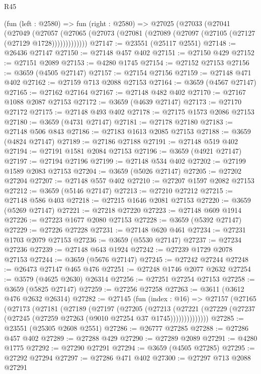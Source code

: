 \begin{lexlean}{R45}
\begin{coremodule}
    (fun (left : @2580) =>
    fun (right : @2580) =>
    @27025
      (@27033
        (@27041
          (@27049
            (@27057
              (@27065 (@27073 (@27081 (@27089 (@27097 (@27105 (@27127 (@27129 @1728)))))))))))))
@27147 := @23551 (@25117 @2551)
@27148 := @26436 @27147
@27150 := @27148 @457 @402
@27151 := @27150 @429
@27152 := @27151 @2089
@27153 := @4280 @1745
@27154 := @27152 @27153
@27156 := @3659 (@4505 @27147)
@27157 := @27154 @27156
@27159 := @27148 @471 @402
@27162 := @27159 @713 @2088 @27153
@27164 := @3659 (@4567 @27147)
@27165 := @27162 @27164
@27167 := @27148 @482 @402
@27170 := @27167 @1088 @2087 @27153
@27172 := @3659 (@4639 @27147)
@27173 := @27170 @27172
@27175 := @27148 @493 @402
@27178 := @27175 @1573 @2086 @27153
@27180 := @3659 (@4731 @27147)
@27181 := @27178 @27180
@27183 := @27148 @506 @843
@27186 := @27183 @1613 @2085 @27153
@27188 := @3659 (@4824 @27147)
@27189 := @27186 @27188
@27191 := @27148 @519 @402
@27194 := @27191 @1581 @2084 @27153
@27196 := @3659 (@4921 @27147)
@27197 := @27194 @27196
@27199 := @27148 @534 @402
@27202 := @27199 @1589 @2083 @27153
@27204 := @3659 (@5026 @27147)
@27205 := @27202 @27204
@27207 := @27148 @557 @402
@27210 := @27207 @1597 @2082 @27153
@27212 := @3659 (@5146 @27147)
@27213 := @27210 @27212
@27215 := @27148 @586 @403
@27218 := @27215 @1646 @2081 @27153
@27220 := @3659 (@5269 @27147)
@27221 := @27218 @27220
@27223 := @27148 @609 @1914
@27226 := @27223 @1677 @2080 @27153
@27228 := @3659 (@5392 @27147)
@27229 := @27226 @27228
@27231 := @27148 @620 @461
@27234 := @27231 @1703 @2079 @27153
@27236 := @3659 (@5530 @27147)
@27237 := @27234 @27236
@27239 := @27148 @643 @1924
@27242 := @27239 @1729 @2078 @27153
@27244 := @3659 (@5676 @27147)
@27245 := @27242 @27244
@27248 := @26473 @27147 @465 @476
@27251 := @27248 @1746 @2077 @2632
@27254 := @3579 (@4625 @2630) @26314
@27256 := @27251 @27254 @27153
@27258 := @3659 (@5825 @27147)
@27259 := @27256 @27258
@27263 := @3611 (@3612 @476 @2632 @26314)
@27282 := @27145
    (fun (index : @16) =>
    @27157
      (@27165
        (@27173
          (@27181
            (@27189
              (@27197
                (@27205
                  (@27213
                    (@27221
                      (@27229 (@27237 (@27245 (@27259 @27263 (@9010 @27254 @37 @1745))))))))))))))
@27285 := @23551 (@25305 @2608 @2551)
@27286 := @26777 @27285
@27288 := @27286 @457 @402
@27289 := @27288 @429
@27290 := @27289 @2089
@27291 := @4280 @1775
@27292 := @27290 @27291
@27294 := @3659 (@4505 @27285)
@27295 := @27292 @27294
@27297 := @27286 @471 @402
@27300 := @27297 @713 @2088 @27291

\end{coremodule}
\end{lexlean}
